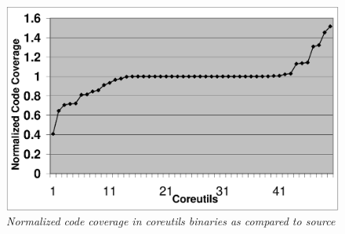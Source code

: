 
\begin{figure}[b]
{
\vspace{-2ex}
\centering
\includegraphics[width=0.6\linewidth]{figures/EPS/klee-coverage.eps}
\caption{\textit{Normalized code coverage in coreutils binaries as compared to source }}
\label{fig:KleeCovRes}
}
\vspace{-5ex}
\end{figure}




